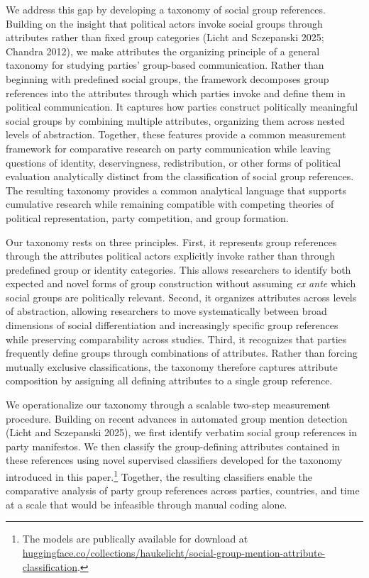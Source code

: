 \documentclass[12pt]{article}
\begin{document}
We address this gap by developing a taxonomy of social group references.
Building on the insight that political actors invoke social groups through attributes rather than fixed group categories (Licht and Sczepanski 2025; Chandra 2012), we make attributes the organizing principle of a general taxonomy for studying parties' group-based communication.
Rather than beginning with predefined social groups, the framework decomposes group references into the attributes through which parties invoke and define them in political communication.
It captures how parties construct politically meaningful social groups by combining multiple attributes, organizing them across nested levels of abstraction.
Together, these features provide a common measurement framework for comparative research on party communication while leaving questions of identity, deservingness, redistribution, or other forms of political evaluation analytically distinct from the classification of social group references.
The resulting taxonomy provides a common analytical language that supports cumulative research while remaining compatible with competing theories of political representation, party competition, and group formation.

Our taxonomy rests on three principles.
First, it represents group references through the attributes political actors explicitly invoke rather than through predefined group or identity categories.
This allows researchers to identify both expected and novel forms of group construction without assuming \emph{ex ante} which social groups are politically relevant.
Second, it organizes attributes across levels of abstraction, allowing researchers to move systematically between broad dimensions of social differentiation and increasingly specific group references while preserving comparability across studies.
Third, it recognizes that parties frequently define groups through combinations of attributes.
Rather than forcing mutually exclusive classifications, the taxonomy therefore captures attribute composition by assigning all defining attributes to a single group reference.

We operationalize our taxonomy through a scalable two-step measurement procedure.
Building on recent advances in automated group mention detection (Licht and Sczepanski 2025), we first identify verbatim social group references in party manifestos.
We then classify the group-defining attributes contained in these references using novel supervised classifiers developed for the taxonomy introduced in this paper.\footnote{%
  The models are publically available for download at \href{https://huggingface.co/collections/haukelicht/social-group-mention-attribute-classification}{huggingface.co/collections/haukelicht/social-group-mention-attribute-classification}.%
}
Together, the resulting classifiers enable the comparative analysis of party group references across parties, countries, and time at a scale that would be infeasible through manual coding alone.
\end{document}

